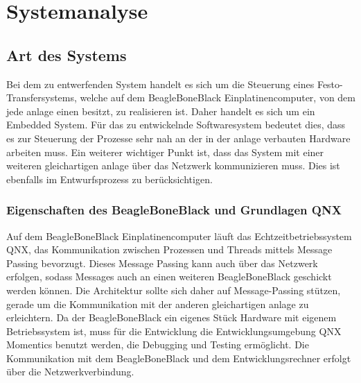 




















\section{Systemanalyse}\label{sec:systemanalyse}


\subsection{Art des Systems}

Bei dem zu entwerfenden System handelt es sich um die Steuerung eines Festo-Transfersystems,
welche auf dem BeagleBoneBlack Einplatinencomputer, von dem jede \gls{anlage} einen besitzt, zu realisieren ist.
Daher handelt es sich um ein Embedded System.
Für das zu entwickelnde Softwaresystem bedeutet dies, dass es zur Steuerung der Prozesse sehr nah
an der in der \gls{anlage} verbauten Hardware arbeiten muss.
Ein weiterer wichtiger Punkt ist, dass das System mit einer weiteren gleichartigen \gls{anlage} über
das Netzwerk kommunizieren muss. Dies ist ebenfalls im Entwurfsprozess zu berücksichtigen.

\subsubsection{Eigenschaften des BeagleBoneBlack und Grundlagen QNX}

Auf dem BeagleBoneBlack Einplatinencomputer läuft das Echtzeitbetriebssystem QNX, das Kommunikation
zwischen Prozessen und Threads mittels Message Passing bevorzugt.
Dieses Message Passing kann auch über das Netzwerk erfolgen, sodass Messages auch an
einen weiteren BeagleBoneBlack geschickt werden können.
Die Architektur sollte sich daher auf Message-Passing stützen, gerade um die Kommunikation mit der
anderen gleichartigen \gls{anlage} zu erleichtern.
Da der BeagleBoneBlack ein eigenes Stück Hardware mit eigenem Betriebssystem ist, muss für die
Entwicklung die Entwicklungsumgebung QNX Momentics benutzt werden, die Debugging und Testing ermöglicht.
Die Kommunikation mit dem BeagleBoneBlack und dem Entwicklungsrechner erfolgt über die Netzwerkverbindung.

